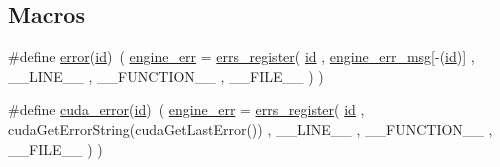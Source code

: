 \subsection*{Macros}
\begin{DoxyCompactItemize}
\item 
\#define \hyperlink{engine__cuda_8cu_a7673862d447029edaf3172ebd94aa28e}{error}(\hyperlink{errs_8c_a7441ef0865bcb3db9b8064dd7375c1ea}{id})~( \hyperlink{engine_8h_a3724bd1c34d31c4ff37eaff52dc0a580}{engine\-\_\-err} = \hyperlink{errs_8h_ae37a9c0e0a0aa4a92dbe64c0f38ed95c}{errs\-\_\-register}( \hyperlink{errs_8c_a7441ef0865bcb3db9b8064dd7375c1ea}{id} , \hyperlink{engine_8h_aa489083c5e5d436bafd05a7860b21804}{engine\-\_\-err\-\_\-msg}\mbox{[}-\/(\hyperlink{errs_8c_a7441ef0865bcb3db9b8064dd7375c1ea}{id})\mbox{]} , \-\_\-\-\_\-\-L\-I\-N\-E\-\_\-\-\_\- , \-\_\-\-\_\-\-F\-U\-N\-C\-T\-I\-O\-N\-\_\-\-\_\- , \-\_\-\-\_\-\-F\-I\-L\-E\-\_\-\-\_\- ) )
\item 
\#define \hyperlink{engine__cuda_8cu_a0295c5fc38a1d1e9a381a97ba0adb616}{cuda\-\_\-error}(\hyperlink{errs_8c_a7441ef0865bcb3db9b8064dd7375c1ea}{id})~( \hyperlink{engine_8h_a3724bd1c34d31c4ff37eaff52dc0a580}{engine\-\_\-err} = \hyperlink{errs_8h_ae37a9c0e0a0aa4a92dbe64c0f38ed95c}{errs\-\_\-register}( \hyperlink{errs_8c_a7441ef0865bcb3db9b8064dd7375c1ea}{id} , cuda\-Get\-Error\-String(cuda\-Get\-Last\-Error()) , \-\_\-\-\_\-\-L\-I\-N\-E\-\_\-\-\_\- , \-\_\-\-\_\-\-F\-U\-N\-C\-T\-I\-O\-N\-\_\-\-\_\- , \-\_\-\-\_\-\-F\-I\-L\-E\-\_\-\-\_\- ) )
\end{DoxyCompactItemize}


